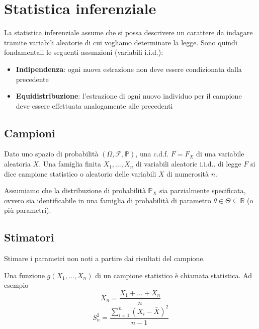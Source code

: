 \newpage
\section{Statistica inferenziale}
La statistica inferenziale assume che si possa descrivere un carattere da indagare tramite variabili aleatorie di cui vogliamo determinare la legge. Sono quindi fondamentali le seguenti assunzioni (variabili i.i.d.):
\begin{itemize}
	\item \textbf{Indipendenza}: ogni nuova estrazione non deve essere condizionata dalla precedente
	\item \textbf{Equidistribuzione}: l'estrazione di ogni nuovo individuo per il campione deve essere effettuata analogamente alle precedenti
\end{itemize}

\subsection{Campioni}
\begin{definition}
	Dato uno spazio di probabilità $(\Omega, \mathcal{F}, \mathbb{P})$, una c.d.f. $F=F_X$ di una variabile aleatoria $X$. Una famiglia finita $X_1, \ldots, X_n$ di variabili aleatorie i.i.d.. di legge $F$ si dice campione statistico o aleatorio delle variabili $X$ di numerosità $n$. 
\end{definition}
\begin{observation}
	Assumiamo che la distribuzione di probabilità $\mathbb{P}_X$ sia parzialmente specificata, ovvero sia identificabile in una famiglia di probabilità di parametro $\theta \in \Theta \subseteq \mathbb{R}$ (o più parametri).
\end{observation}

\subsection{Stimatori}
\begin{definition}
	Stimare i parametri non noti a partire dai risultati del campione.
\end{definition}
\begin{definition}
	Una funzione $g(X_1, \ldots, X_n)$ di un campione statistico è chiamata statistica. Ad esempio
	\begin{equation}
		\bar{X}_n = \frac{X_1 + \ldots + X_n}{n} \tag{Media campionaria}
	\end{equation}
	\begin{equation}
		\label{eq:varcamp}
		S^2_n = \frac{\sum_{i=1}^{n}(X_i-\bar{X})^2}{n-1} \tag{Varianza campionaria}
	\end{equation}
\end{definition}

